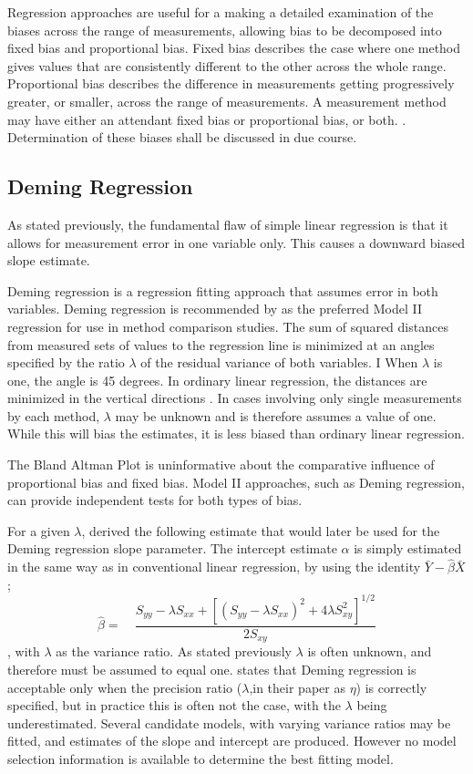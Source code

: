 \documentclass[12pt, a4paper]{report}
\theoremstyle{plain}
\theoremstyle{definition}
\theoremstyle{remark}
\begin{document}
Regression approaches are useful for a making a detailed examination of the biases across the range of measurements, allowing bias to be decomposed into fixed bias and proportional bias.
Fixed bias describes the case where one method gives values that are consistently different
to the other across the whole range. Proportional
bias describes the difference in measurements getting progressively greater, or smaller, across the range of measurements. A measurement method may have either an attendant fixed bias or proportional bias, or both. \citep{ludbrook}. Determination of these biases shall be discussed in due course.


\subsection{Deming Regression}

As stated previously, the fundamental flaw of simple linear regression is that it allows for measurement error in one variable only. This causes a downward biased slope estimate.

Deming regression is a regression fitting approach that assumes error in both variables. Deming regression is recommended by \citet*{CornCoch} as the
preferred Model II regression for use in method comparison
studies.
The sum of squared distances from measured sets of values to the regression line is minimized at an angles specified by the ratio $\lambda$ of the residual variance of both variables. I
When $\lambda$ is one, the angle is 45 degrees. In ordinary linear regression, the distances are minimized in the vertical directions \citep{linnet99}.
In cases involving only single measurements by each method, $\lambda$ may be unknown and is therefore assumes a value of one. While this will bias the estimates, it is less biased than ordinary linear regression.

The Bland Altman Plot is
uninformative about the comparative influence of proportional bias
and fixed bias. Model II approaches, such as Deming regression,  can provide independent tests for
both types of bias.

For a given $\lambda$, \citet{Kummel} derived the following
estimate that would later be used for the Deming regression slope
parameter. The intercept estimate $\alpha$
is simply estimated in the same way as in conventional linear
regression, by using the identity $\bar{Y}-\hat{\beta}\bar{X}$;
\begin{equation}
\hat{\beta} =\quad \frac{S_{yy} - \lambda S_{xx}+[(S_{yy} -
\lambda S_{xx})^{2}+ 4\lambda S^{2}_{xy}]^{1/2}}{2S_{xy}}
\end{equation},
with $\lambda$ as the variance ratio. As stated previously $\lambda$ is often unknown, and therefore must be assumed to equal one. \citet{CarollRupert} states that Deming
regression is acceptable only when the precision ratio ($\lambda$,in their paper as $\eta$) is correctly specified, but in practice this is often not the case, with the $\lambda$ being underestimated. Several candidate models, with varying variance ratios may be fitted, and estimates of the slope and intercept are produced. However no model selection information is available to determine the best fitting model.
\end{document}
